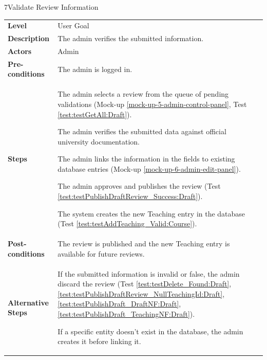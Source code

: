 \begin{usecasetable}{7}{Validate Review Information}
	\begin{tabularx}{\textwidth}{@{} l|X @{}}
		\textbf{Level} & User Goal \\
		\textbf{Description} & The admin verifies the submitted information. \\
		\textbf{Actors} & Admin \\
		\textbf{Pre-conditions} & The admin is logged in. \\
		\textbf{Steps} &
		\begin{tabenum}
			\item The admin selects a review from the queue of pending validations (Mock-up \ref{mock-up-5-admin-control-panel}, Test \ref{test:testGetAll:Draft}).
			\item The admin verifies the submitted data against official university documentation. 
			\item The admin links the information in the fields to existing database entries (Mock-up \ref{mock-up-6-admin-edit-panel}).
			\item The admin approves and publishes the review (Test \ref{test:testPublishDraftReview_Success:Draft}).
			\item The system creates the new Teaching entry in the database (Test \ref{test:testAddTeaching_Valid:Course}).
		\end{tabenum} \\
		\textbf{Post-conditions} & The review is published and the new Teaching entry is available for future reviews. \\
		\textbf{Alternative Steps} & \begin{tabitem}
			\item[2a.] If the submitted information is invalid or false, the admin discard the review (Test \ref{test:testDelete_Found:Draft}, \ref{test:testPublishDraftReview_NullTeachingId:Draft}, \ref{test:testPublishDraft_DraftNF:Draft}, \ref{test:testPublishDraft_TeachingNF:Draft}).
			\item[3a.] If a specific entity doesn't exist in the database, the admin creates it before linking it.
		\end{tabitem}
	\end{tabularx}
\end{usecasetable}

